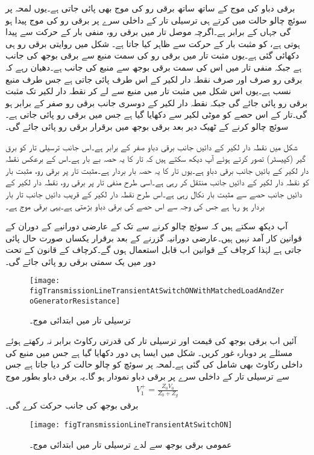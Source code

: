 برقی دباو کی موج کے ساتھ ساتھ برقی رو کی موج بھی پائی جاتی ہے۔یوں لمحہ  پر سوئچ چالو حالت میں کرتے ہی ترسیلی تار کے داخلی سرے پر  برقی رو کی موج پیدا ہو گی جہاں  کے برابر ہے۔اگرچہ موصل تار میں برقی رو، منفی بار کے حرکت سے پیدا ہوتی ہے،  کو مثبت بار کے حرکت سے ظاہر کیا جاتا ہے۔ شکل  میں روایتی برقی رو ہی دکھائی گئی ہے۔یوں مثبت تار میں برقی رو کی سمت منبع سے برقی بوجھ کی جانب ہے جبکہ منفی تار میں اس کی سمت برقی بوجھ سے منبع کی جانب ہے۔دھیان رہے کہ برقی رو صرف اور صرف نقطہ دار لکیر کے اس طرف پائی جاتی ہے جس طرف منبع نسب ہے۔یوں اس شکل میں مثبت تار میں منبع سے لے کر نقطہ دار لکیر تک مثبت برقی رو پائی جائے گی جبکہ نقطہ دار لکیر کے دوسری جانب برقی رو صفر کے برابر ہو گی۔تار کے اس حصے کو موٹی لکیر سے دکھایا گیا ہے جس میں برقی رو پائی جاتی ہے۔سوئچ چالو کرنے کے ٹھیک  دیر بعد برقی بوجھ میں برقرار  برقی رو  پائی جائے گی۔

شکل  میں نقطہ دار لکیر کے دائیں جانب برقی دباو صفر کے برابر ہے۔اس جانب ترسیلی تار کو برق گیر (کپیسٹر)  تصور کرتے ہوئے آپ دیکھ سکتے ہیں کہ تار کا یہ حصہ بے بار  ہے۔اس کے برعکس نقطہ دار لکیر کے بائیں جانب برقی دباو  ہے۔یوں تار کا یہ حصہ بار بردار ہے۔مثبت تار پر برقی رو، مثبت بار کو نقطہ دار لکیر کے دائیں جانب منتقل کر رہی ہے۔اسی طرح منفی تار پر برقی رو، نقطہ دار لکیر کے دائیں جانب حصے سے مثبت بار نکال رہی ہے۔اس طرح نقطہ دار لکیر کے قریب دائیں جانب تار بار بردار ہو رہا ہے جس کی وجہ سے اس حصے کی برقی دباو بڑھتی ہے۔یہی برقی موج ہے۔

آپ دیکھ سکتے ہیں کہ  سوئچ چالو کرنے سے  تک کے عارضی دورانیے کے دوران  کے قوانین کار آمد نہیں ہیں۔عارضی دورانیہ گزرنے کے بعد برقرار یکساں صورت حال پائی جاتی ہے لہٰذا کرچاف کے قوانین اب قابل استعمال ہوں گے۔کرچاف کے قانون کے تحت دور میں یک سمتی برقی رو  پائی جائے گی۔
\begin{figure}
\centering
\texttt{[image: figTransmissionLineTransientAtSwitchONWithMatchedLoadAndZeroGeneratorResistance]}
\caption{ترسیلی تار میں ابتدائی موج۔}
\label{شکل_ترسیلی_ابتدائی_موج}
\end{figure}

آئیں اب برقی بوجھ کی قیمت اور ترسیلی تار کی قدرتی رکاوٹ برابر نہ رکھتے ہوئے مسئلے پر دوبارہ غور کریں۔ شکل  میں ایسا ہی دور دکھایا گیا ہے جس میں منبع کی داخلی رکاوٹ بھی شامل کی گئی ہے۔لمحہ  پر سوئچ کو چالو حالت کر دیا جاتا ہے جس سے ترسیلی تار کے داخلی سرے پر  برقی دباو نمودار ہو گا۔یہ برقی دباو بطور موج  
\begin{align}\label{مساوات_ترسیلی_عارضی_پہلی}
V_1^+=\frac{Z_0 V_0}{Z_0+Z_g}
\end{align}
برقی بوجھ کی جانب حرکت کرے گی۔
\begin{figure}
\centering
\texttt{[image: figTransmissionLineTransientAtSwitchON]}
\caption{عمومی برقی بوجھ سے لدے ترسیلی تار میں ابتدائی موج۔}
\label{شکل_ترسیلی_عمومی_بار_ابتدائی_موج}
\end{figure}

